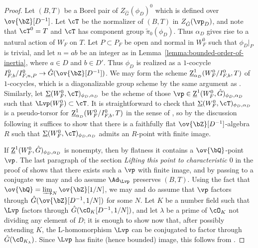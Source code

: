 \begin{proof}
    Let $(B, T)$ be a Borel pair of $Z_{\hat{G}}(\phi_D)^0$ which is defined over $\ov{\bZ}[D^{-1}]$. Let $\cT$ be the normalizer of $(B, T)$ in $Z_{\hat{G}}(\vp_D)$, and note that $\cT^0 = T$ and $\cT$ has component group $\widetilde{\pi}_0(\phi_D)$. Thus $\alpha_D$ gives rise to a natural action of $W_F$ on $T$. Let $P \subset P_F$ be open and normal in $W_F^0$ such that $\phi_D|_P$ is trivial, and let $n = ab$ be an integer as in Lemma~\ref{lemma:bounded-order-of-inertia}, where $a \in D$ and $b \in D'$. Thus $\phi_D$ is realized as a $1$-cocycle $I_{F, b}^0/I_{F, n, P}^0 \to \hat{G}(\ov{\bZ}[D^{-1}])$. We may form the scheme $\underline{\rm{Z}}^1_{\alpha_D}(W_F^0/I_{F, b}^0, T)$ of $1$-cocycles, which is a diagonalizable group scheme by the same argument as \cite[3.6(1)]{DHKM}. Similarly, let $\underline{\Sigma}(W_F^0, \cT)_{\phi_D, \alpha_D}$ be the scheme of those $\vp \in \underline{\rm{Z}}^1(W_F^0, \hat{G})_{\phi_D, \alpha_D}$ such that $\Lvp(W_F^0) \subset \cT$. It is straightforward to check that $\underline{\Sigma}(W_F^0, \cT)_{\phi_D, \alpha_D}$ is a pseudo-torsor for $\underline{\rm{Z}}^1_{\alpha_D}(W_F^0/I_{F, b}^0, T)$ in the sense of \cite[\href{https://stacks.math.columbia.edu/tag/0497}{Tag 0497}]{stacks-project}, so by the discussion following \cite[3.6]{DHKM} it suffices to show that there is a faithfully flat $\ov{\bZ}[D^{-1}]$-algebra $R$ such that $\underline{\Sigma}(W_F^0, \cT)_{\phi_D, \alpha_D}$ admits an $R$-point with finite image.\smallskip

    If $\underline{\rm{Z}}^1(W_F^0, \hat{G})_{\phi_D, \alpha_D}$ is nonempty, then by flatness it contains a $\ov{\bQ}$-point $\vp$. The last paragraph of the section \textit{Lifting this point to characteristic $0$} in the proof of \cite[3.6]{DHKM} shows that there exists such a $\vp$ with finite image, and by passing to a conjugate we may and do assume $\Ad_{\Lvp}$ preserves $(B, T)$. Using the fact that $\ov{\bQ} = \varinjlim_N \ov{\bZ}[1/N]$, we may and do assume that $\vp$ factors through $\hat{G}(\ov{\bZ}[D^{-1}, 1/N])$ for some $N$. Let $K$ be a number field such that $\Lvp$ factors through $\hat{G}(\cO_K[D^{-1}, 1/N])$, and let $\lambda$ be a prime of $\cO_K$ not dividing any element of $D$; it is enough to show now that, after possibly extending $K$, the L-homomorphism $\Lvp$ can be conjugated to factor through $\hat{G}(\cO_{K_{\lambda}})$. Since $\Lvp$ has finite (hence bounded) image, this follows from \cite[1.3]{Martin-Vinberg}.
\end{proof}

